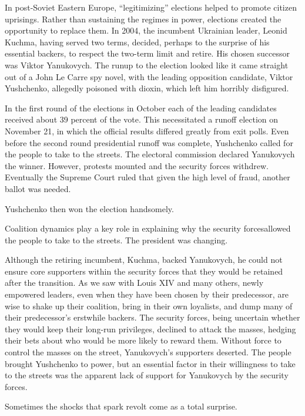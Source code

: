 \documentclass[10pt]{article}
\begin{document}
{\large In post-Soviet Eastern Europe, ``legitimizing'' elections helped to
promote citizen uprisings. Rather than sustaining the regimes in power, elections
created the opportunity to replace them. In 2004, the incumbent Ukrainian leader,
Leonid Kuchma, having served two terms, decided, perhaps to the surprise of his
essential backers, to respect the two-term limit and retire. His chosen successor
was Viktor Yanukovych. The runup to the election looked like it came straight out
of a John Le Carre spy novel, with the leading opposition candidate, Viktor
Yushchenko, allegedly poisoned with dioxin, which left him horribly disfigured.}

{\large In the first round of the elections in October each of the leading
candidates received about 39 percent of the vote. This necessitated a runoff
election on November 21, in which the official results differed greatly from exit
polls. Even before the second round presidential runoff was complete, Yushchenko
called for the people to take to the streets. The electoral commission declared
Yanukovych the winner. However, protests mounted and the security forces
withdrew. Eventually the Supreme Court ruled that given the high level of fraud,
another ballot was needed.}

{\large Yushchenko then won the election handsomely.}

{\large Coalition dynamics play a key role in explaining why the security
forcesallowed the people to take to the streets. The president was changing.}

{\large Although the retiring incumbent, Kuchma, backed Yanukovych, he could not
ensure core supporters within the security forces that they would be retained
after the transition. As we saw with Louis XIV and many others, newly empowered
leaders, even when they have been chosen by their predecessor, are wise to shake
up their coalition, bring in their own loyalists, and dump many of their
predecessor's erstwhile backers. The security forces, being uncertain whether
they would keep their long-run privileges, declined to attack the masses, hedging
their bets about who would be more likely to reward them. Without force to
control the masses on the street, Yanukovych's supporters deserted. The people
brought Yushchenko to power, but an essential factor in their willingness to take
to the streets was the apparent lack of support for Yanukovych by the security
forces.}

{\large Sometimes the shocks that spark revolt come as a total surprise.}
\end{document}
